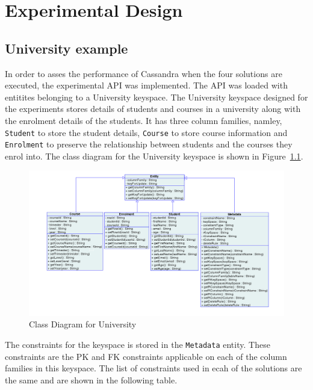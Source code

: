 \chapter{Experimental Design}



\section{University example}
In order to asses the performance of Cassandra when the four solutions are
executed, the experimental \ac{API} was implemented. The \ac{API} was loaded
with entitites belonging to a University keyspace. The University keyspace
designed for the experiments stores details of students and courses in a
university along with the enrolment details of the students. It has three column
families, namley,
\texttt{Student} to store the student details, \texttt{Course} to store course
information and
\texttt{Enrolment} to preserve the relationship between students and the courses
they enrol into. The class diagram for the University keyspace is shown in
Figure~\ref{fexp:ClassDiagram}.

	\begin{figure}[h] \centering
		\includegraphics[width=1\textwidth]{./figure/Solutions/classdiagram-experimental.png}
		\caption{Class Diagram for University}\label{fexp:ClassDiagram}
	\end{figure}

The constraints for the keyspace is stored in the \texttt{Metadata} entity.
These constraints are the \ac{PK} and \ac{FK} constraints applicable on each of
the column families in this keyspace. The list of constraints used in ecah of
the solutions are the same and are shown in the following table.
\newline


